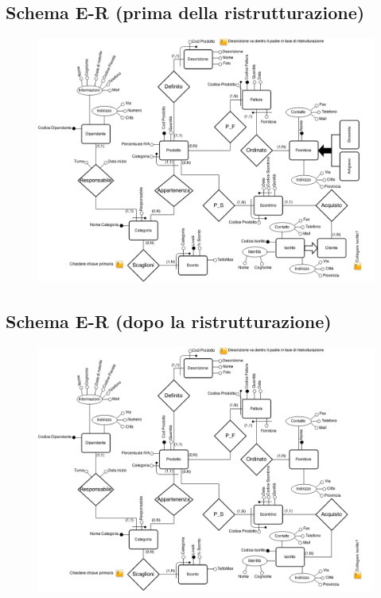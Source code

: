 
\begin{landscape}

  \thispagestyle{empty}
  
  \subsection{Schema E-R (prima della ristrutturazione)}
  
  \begin{figure}[h!]
    \centering
    \includegraphics[scale=0.6]{include/progettazioneConcettuale/schemaER/PreNorm}
  \end{figure}



\newpage


  \thispagestyle{empty}

  \subsection{Schema E-R (dopo la ristrutturazione)}

  \begin{figure}[h!]
    \centering
    \includegraphics[scale=0.6]{include/progettazioneConcettuale/schemaER/PostRistrutturaz}
  \end{figure}
  
\end{landscape}

\restoregeometry
